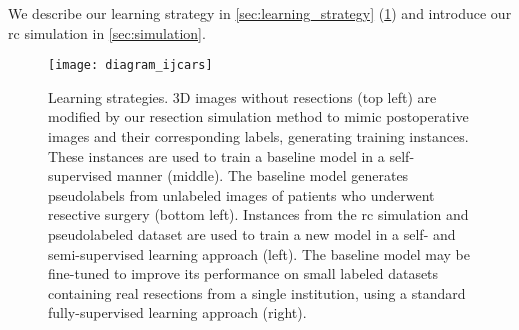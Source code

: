 We describe our learning strategy in \cref{sec:learning_strategy} (\cref{fig:diagram_ijcars})
and introduce our \ac{rc} simulation in \cref{sec:simulation}.

\begin{figure}
  \centering
  \texttt{[image: diagram\_ijcars]}
  \caption[Learning strategies for cavity segmentation]{
    Learning strategies.
    3D images without resections (top left) are modified by our resection simulation method to mimic postoperative images and their corresponding labels, generating training instances.
    These instances are used to train a baseline model in a self-supervised manner (middle).
    The baseline model generates pseudolabels from unlabeled images of patients who underwent resective surgery (bottom left).
    Instances from the \ac{rc} simulation and pseudolabeled dataset are used to train a new model in a self- and semi-supervised learning approach (left).
    The baseline model may be fine-tuned to improve its performance on small labeled datasets containing real resections from a single institution, using a standard fully-supervised learning approach (right).
  }
  \label{fig:diagram_ijcars}
\end{figure}
